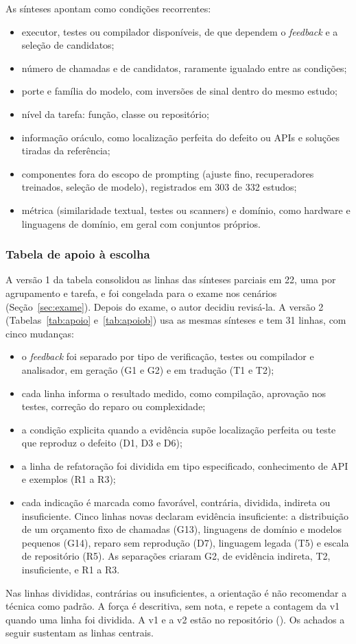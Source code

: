 As sínteses apontam como condições recorrentes:
\begin{itemize}
  \item executor, testes ou compilador disponíveis, de que dependem o \textit{feedback} e a
    seleção de candidatos;
  \item número de chamadas e de candidatos, raramente igualado entre as condições;
  \item porte e família do modelo, com inversões de sinal dentro do mesmo estudo;
  \item nível da tarefa: função, classe ou repositório;
  \item informação oráculo, como localização perfeita do defeito ou APIs e soluções
    tiradas da referência;
  \item componentes fora do escopo de prompting (ajuste fino, recuperadores treinados,
    seleção de modelo), registrados em 303 de 332 estudos;
  \item métrica (similaridade textual, testes ou scanners) e domínio, como hardware e
    linguagens de domínio, em geral com conjuntos próprios.
\end{itemize}

\subsubsection{Tabela de apoio à escolha}

A versão 1 da tabela consolidou as linhas das sínteses parciais em 22, uma por agrupamento
e tarefa, e foi congelada para o exame nos cenários (Seção~\ref{sec:exame}). Depois do
exame, o autor decidiu revisá-la. A versão 2 (Tabelas~\ref{tab:apoio} e~\ref{tab:apoiob})
usa as mesmas sínteses e tem 31 linhas, com cinco mudanças:
\begin{itemize}
  \item o \textit{feedback} foi separado por tipo de verificação, testes ou compilador e
  analisador, em geração (G1 e G2) e em tradução (T1 e T2);
  \item cada linha informa o resultado medido, como compilação, aprovação nos testes,
  correção do reparo ou complexidade;
  \item a condição explicita quando a evidência supõe localização perfeita ou teste que
  reproduz o defeito (D1, D3 e D6);
  \item a linha de refatoração foi dividida em tipo especificado, conhecimento de API e
  exemplos (R1 a R3);
  \item cada indicação é marcada como favorável, contrária, dividida, indireta ou
  insuficiente. Cinco linhas novas declaram evidência insuficiente: a distribuição de um
  orçamento fixo de chamadas (G13), linguagens de domínio e modelos pequenos (G14), reparo
  sem reprodução (D7), linguagem legada (T5) e escala de repositório (R5). As separações
  criaram G2, de evidência indireta, T2, insuficiente, e R1 a R3.
\end{itemize}
Nas linhas divididas, contrárias ou insuficientes, a orientação é não recomendar a técnica
como padrão. A força é descritiva, sem nota, e repete a contagem da v1 quando uma linha foi
dividida. A v1 e a v2 estão no repositório (). Os achados a
seguir sustentam as linhas centrais.

